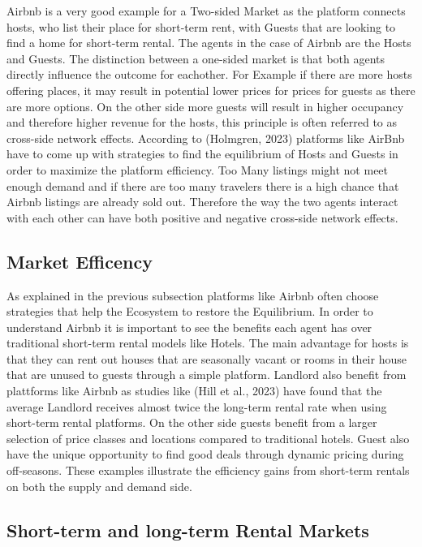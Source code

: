 \documentclass[Department of Economics]{AEA}
\begin{document}
Airbnb is a very good example for a Two-sided Market as the platform
connects hosts, who list their place for short-term rent, with Guests
that are looking to find a home for short-term rental. The agents in the
case of Airbnb are the Hosts and Guests. The distinction between a
one-sided market is that both agents directly influence the outcome for
eachother. For Example if there are more hosts offering places, it may
result in potential lower prices for prices for guests as there are more
options. On the other side more guests will result in higher occupancy
and therefore higher revenue for the hosts, this principle is often
referred to as cross-side network effects. According to (Holmgren, 2023)
platforms like AirBnb have to come up with strategies to find the
equilibrium of Hosts and Guests in order to maximize the platform
efficiency. Too Many listings might not meet enough demand and if there
are too many travelers there is a high chance that Airbnb listings are
already sold out. Therefore the way the two agents interact with each
other can have both positive and negative cross-side network effects.

\subsection{Market Efficency}\label{market-efficency}

As explained in the previous subsection platforms like Airbnb often
choose strategies that help the Ecosystem to restore the Equilibrium. In
order to understand Airbnb it is important to see the benefits each
agent has over traditional short-term rental models like Hotels. The
main advantage for hosts is that they can rent out houses that are
seasonally vacant or rooms in their house that are unused to guests
through a simple platform. Landlord also benefit from plattforms like
Airbnb as studies like (Hill et al., 2023) have found that the average
Landlord receives almost twice the long-term rental rate when using
short-term rental platforms. On the other side guests benefit from a
larger selection of price classes and locations compared to traditional
hotels. Guest also have the unique opportunity to find good deals
through dynamic pricing during off-seasons. These examples illustrate
the efficiency gains from short-term rentals on both the supply and
demand side.

\subsection{Short-term and long-term Rental
Markets}\label{short-term-and-long-term-rental-markets}
\end{document}
